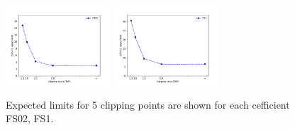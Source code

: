 \begin{figure}[ht]
    \centering
    	\includegraphics[width=0.35\textwidth]{figures/aQGC/ClippedFS02.pdf}
    	\includegraphics[width=0.35\textwidth]{figures/aQGC/ClippedFS1.pdf}
        \caption{Expected limits for 5 clipping points are shown for each cefficient FS02, FS1.}
\end{figure}



